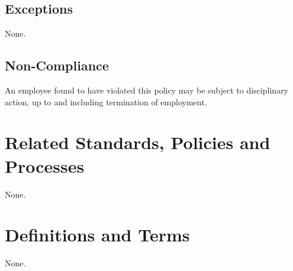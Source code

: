 \subsection{Exceptions}
None. 
\subsection{Non-Compliance}
An employee found to have violated this policy may be subject to disciplinary action, up to and including termination of employment. 
\section{Related Standards, Policies and Processes}
None.
\section{Definitions and Terms}
None.
\CommonRevisionHistory